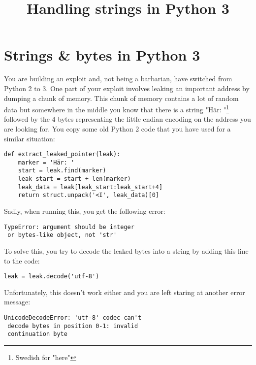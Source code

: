 \documentclass[twocolumn]{article}
\begin{document}
\title{Handling strings in Python 3}
\date{}
\section*{Strings \& bytes in Python 3}

You are building an exploit and, not being a barbarian, have switched from Python 2 to 3. One part of your exploit involves leaking an important address by dumping a chunk of memory. This chunk of memory contains a lot of random data but somewhere in the middle you know that there is a string "Här: "\footnote{Swedish for "here"} followed by the 4 bytes representing the little endian encoding on the address you are looking for. You copy some old Python 2 code that you have used for a similar situation:
\vspace*{-0.7\baselineskip}

\begin{verbatim}
def extract_leaked_pointer(leak):
    marker = 'Här: '
    start = leak.find(marker)
    leak_start = start + len(marker)
    leak_data = leak[leak_start:leak_start+4]
    return struct.unpack('<I', leak_data)[0]
\end{verbatim}
\vspace*{-0.7\baselineskip}

Sadly, when running this, you get the following error:
\vspace*{-0.7\baselineskip}

\begin{verbatim}
TypeError: argument should be integer
 or bytes-like object, not 'str'
\end{verbatim}
\vspace*{-0.7\baselineskip}

To solve this, you try to decode the leaked bytes into a string by adding this line to the code:
\vspace*{-0.7\baselineskip}

\begin{verbatim}
leak = leak.decode('utf-8')
\end{verbatim}
\vspace*{-0.7\baselineskip}

Unfortunately, this doesn't work either and you are left staring at another error message:

\begin{verbatim}
UnicodeDecodeError: 'utf-8' codec can't
 decode bytes in position 0-1: invalid 
 continuation byte
\end{verbatim}
\end{document}
